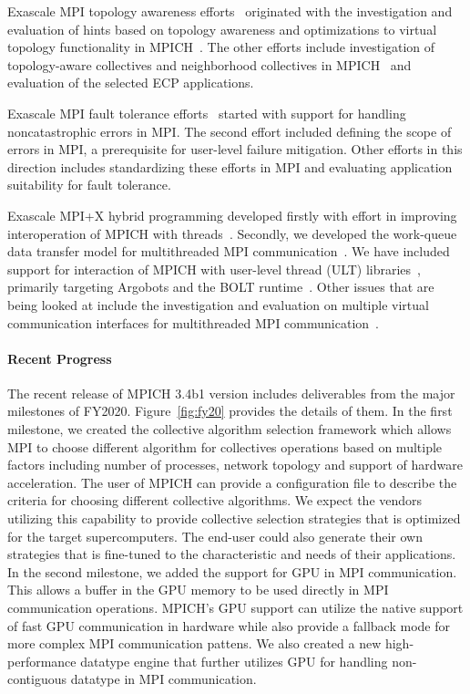 Exascale MPI topology awareness efforts~\cite{Topo1,Topo2} originated
with the investigation and evaluation of hints based on topology
awareness and optimizations to virtual topology functionality in
MPICH~\cite{topo-io,topo-io2}. The other efforts include investigation
of topology-aware collectives and neighborhood collectives in
MPICH~\cite{coll} and evaluation of the selected ECP applications.

Exascale MPI fault tolerance efforts~\cite{FT1, FT2} started with
support for handling noncatastrophic errors in MPI. The second effort
included defining the scope of errors in MPI, a prerequisite for
user-level failure mitigation. Other efforts in this direction
includes standardizing these efforts in MPI and evaluating application
suitability for fault tolerance.

Exascale MPI+X hybrid programming developed firstly with effort in
improving interoperation of MPICH with threads~\cite{interthread}.
Secondly, we developed the work-queue data transfer model for
multithreaded MPI communication~\cite{workq}. We have included support
for interaction of MPICH with user-level thread (ULT)
libraries~\cite{ULT}, primarily targeting Argobots and the BOLT
runtime~\cite{BOLT}.  Other issues that are being looked at include the
investigation and evaluation on multiple virtual communication
interfaces for multithreaded MPI communication~\cite{VCI}.

\paragraph{Recent Progress}

The recent release of MPICH 3.4b1 version includes deliverables from the
major milestones of FY2020. Figure~\ref{fig:fy20} provides the details
of them. In the first milestone, we created the collective algorithm
selection framework which allows MPI to choose different algorithm for
collectives operations based on multiple factors including number of
processes, network topology and support of hardware acceleration. The
user of MPICH can provide a configuration file to describe the criteria
for choosing different collective algorithms. We expect the vendors
utilizing this capability to provide collective selection strategies
that is optimized for the target supercomputers. The end-user could also
generate their own strategies that is fine-tuned to the characteristic
and needs of their applications.
In the second milestone, we added the support for GPU in MPI
communication. This allows a buffer in the GPU memory to be used
directly in MPI communication operations. MPICH's GPU support can
utilize the native support of fast GPU communication in hardware while also
provide a fallback mode for more complex MPI communication pattens. We
also created a new high-performance datatype engine that further
utilizes GPU for handling non-contiguous datatype in MPI communication.

